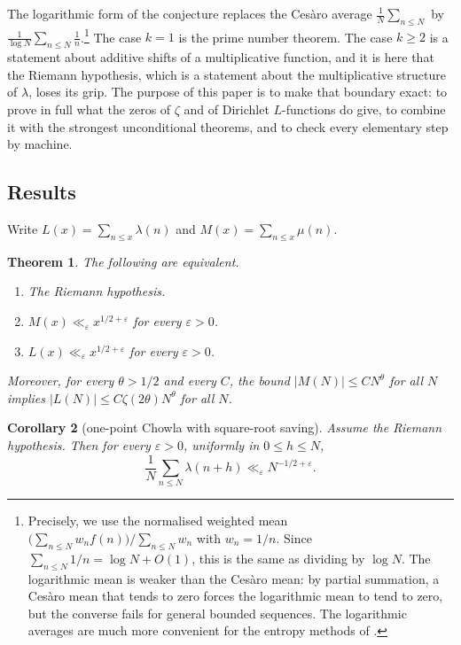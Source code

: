 \documentclass[11pt]{amsart}
\numberwithin{equation}{section}
\theoremstyle{plain}
\newtheorem{thm}{Theorem}[section]
\newtheorem{cor}[thm]{Corollary}
\theoremstyle{definition}
\theoremstyle{remark}
\begin{document}
The logarithmic form of the conjecture replaces the Cesàro average $\frac1N\sum_{n\le N}$ by $\frac{1}{\log N}\sum_{n\le N}\frac1n$.\footnote{Precisely, we use the normalised weighted mean $\big(\sum_{n\le N}w_n f(n)\big)/\sum_{n\le N}w_n$ with $w_n=1/n$. Since $\sum_{n\le N}1/n=\log N+O(1)$, this is the same as dividing by $\log N$. The logarithmic mean is weaker than the Cesàro mean: by partial summation, a Cesàro mean that tends to zero forces the logarithmic mean to tend to zero, but the converse fails for general bounded sequences. The logarithmic averages are much more convenient for the entropy methods of \cite{Tao16,TT18,TT19}.} The case $k=1$ is the prime number theorem. The case $k\ge2$ is a statement about additive shifts of a multiplicative function, and it is here that the Riemann hypothesis, which is a statement about the multiplicative structure of $\lambda$, loses its grip. The purpose of this paper is to make that boundary exact: to prove in full what the zeros of $\zeta$ and of Dirichlet $L$-functions do give, to combine it with the strongest unconditional theorems, and to check every elementary step by machine.

\subsection{Results}
Write $L(x)=\sum_{n\le x}\lambda(n)$ and $M(x)=\sum_{n\le x}\mu(n)$.

\begin{thm}\label{thm:A}
The following are equivalent.
\begin{enumerate}
\item The Riemann hypothesis.
\item $M(x)\ll_\varepsilon x^{1/2+\varepsilon}$ for every $\varepsilon>0$.
\item $L(x)\ll_\varepsilon x^{1/2+\varepsilon}$ for every $\varepsilon>0$.
\end{enumerate}
Moreover, for every $\theta>1/2$ and every $C$, the bound $|M(N)|\le CN^\theta$ for all $N$ implies $|L(N)|\le C\zeta(2\theta)N^\theta$ for all $N$.
\end{thm}

\begin{cor}[one-point Chowla with square-root saving]\label{cor:onepoint}
Assume the Riemann hypothesis. Then for every $\varepsilon>0$, uniformly in $0\le h\le N$,
\[
\frac1N\sum_{n\le N}\lambda(n+h)\ll_\varepsilon N^{-1/2+\varepsilon}.
\]
\end{cor}
\end{document}
